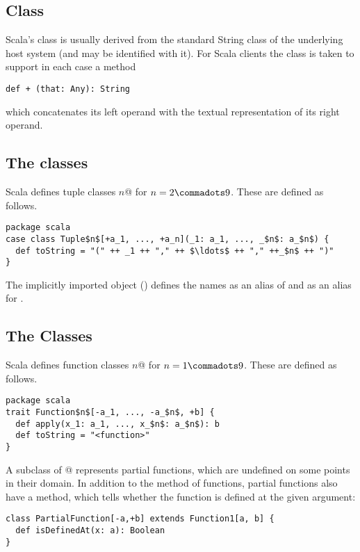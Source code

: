 {{{\subsection{Class \large{}}

Scala's \lstinline@String@ class is usually derived from the standard String
class of the underlying host system (and may be identified with
it). For Scala clients the class is taken to support in each case a
method
\begin{lstlisting}
def + (that: Any): String 
\end{lstlisting}
which concatenates its left operand with the textual representation of its
right operand.

\subsection{The \large{} classes}

Scala defines tuple classes \lstinline@Tuple$n$@ for $n = 2 \commadots 9$.
These are defined as follows.

\begin{lstlisting}
package scala 
case class Tuple$n$[+a_1, ..., +a_n](_1: a_1, ..., _$n$: a_$n$) {
  def toString = "(" ++ _1 ++ "," ++ $\ldots$ ++ "," ++_$n$ ++ ")"
}
\end{lstlisting}

The implicitly imported  object () defines
the names  as an alias of  and 
as an alias for .

\subsection{The \large{} Classes}
\label{sec:cls-function}

Scala defines function classes \lstinline@Function$n$@ for $n = 1 \commadots 9$.
These are defined as follows.

\begin{lstlisting}
package scala 
trait Function$n$[-a_1, ..., -a_$n$, +b] {
  def apply(x_1: a_1, ..., x_$n$: a_$n$): b 
  def toString = "<function>" 
}
\end{lstlisting}

A subclass of @ represents partial functions,
which are undefined on some points in their domain. In addition to the
 method of functions, partial functions also have a
 method, which tells whether the function is defined
at the given argument:
\begin{lstlisting}
class PartialFunction[-a,+b] extends Function1[a, b] {
  def isDefinedAt(x: a): Boolean
}
\end{lstlisting}

}}}
